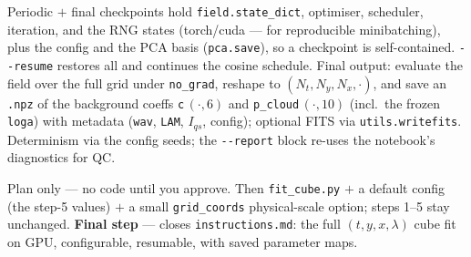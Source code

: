 \documentclass[10pt,a4paper]{article}
\newcommand{\co}[1]{{\small\texttt{#1}}}
\begin{document}
Periodic $+$ final checkpoints hold \co{field.state\_dict}, optimiser, scheduler, iteration, and the RNG states (torch/cuda --- for reproducible minibatching), plus the config and the PCA basis (\co{pca.save}), so a checkpoint is self-contained. \co{-{}-resume} restores all and continues the cosine schedule. Final output: evaluate the field over the full grid under \co{no\_grad}, reshape to $(N_t,N_y,N_x,\cdot)$, and save an \co{.npz} of the background coeffs \co{c}\,$(\cdot,6)$ and \co{p\_cloud}\,$(\cdot,10)$ (incl.\ the frozen \co{loga}) with metadata (\co{wav}, \co{LAM}, $I_{qs}$, config); optional FITS via \co{utils.writefits}. Determinism via the config seeds; the \co{-{}-report} block re-uses the notebook's diagnostics for QC.

\vspace{1pt}{\footnotesize\color{gry}\rule{\textwidth}{0.4pt}}
{\sffamily\color{gry}\footnotesize Plan only --- no code until you approve. Then \co{fit\_cube.py} $+$ a default config (the step-5 values) $+$ a small \co{grid\_coords} physical-scale option; steps 1--5 stay unchanged. \textbf{Final step} --- closes \co{instructions.md}: the full $(t,y,x,\lambda)$ cube fit on GPU, configurable, resumable, with saved parameter maps.}
\end{document}
